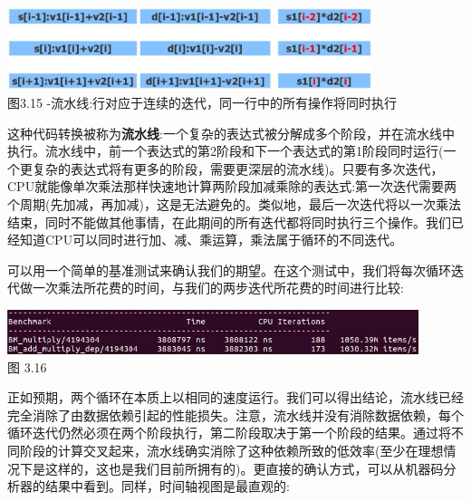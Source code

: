 \begin{center}
\includegraphics[width=0.8\textwidth]{content/1/chapter3/images/15.jpg}\\
图3.15 -流水线:行对应于连续的迭代，同一行中的所有操作将同时执行
\end{center}

这种代码转换被称为\textbf{流水线}:一个复杂的表达式被分解成多个阶段，并在流水线中执行。流水线中，前一个表达式的第2阶段和下一个表达式的第1阶段同时运行(一个更复杂的表达式将有更多的阶段，需要更深层的流水线)。只要有多次迭代，CPU就能像单次乘法那样快速地计算两阶段加减乘除的表达式:第一次迭代需要两个周期(先加减，再加减)，这是无法避免的。类似地，最后一次迭代将以一次乘法结束，同时不能做其他事情，在此期间的所有迭代都将同时执行三个操作。我们已经知道CPU可以同时进行加、减、乘运算，乘法属于循环的不同迭代。

可以用一个简单的基准测试来确认我们的期望。在这个测试中，我们将每次循环迭代做一次乘法所花费的时间，与我们的两步迭代所花费的时间进行比较:

\begin{center}
\includegraphics[width=0.9\textwidth]{content/1/chapter3/images/16.jpg}\\
图 3.16
\end{center}

正如预期，两个循环在本质上以相同的速度运行。我们可以得出结论，流水线已经完全消除了由数据依赖引起的性能损失。注意，流水线并没有消除数据依赖，每个循环迭代仍然必须在两个阶段执行，第二阶段取决于第一个阶段的结果。通过将不同阶段的计算交叉起来，流水线确实消除了这种依赖所致的低效率(至少在理想情况下是这样的，这也是我们目前所拥有的)。更直接的确认方式，可以从机器码分析器的结果中看到。同样，时间轴视图是最直观的:

